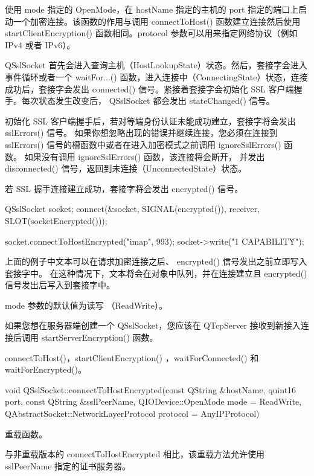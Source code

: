 使用 mode 指定的 OpenMode，在 hostName 指定的主机的 port 指定的端口上启动一个加密连接。该函数的作用与调用 connectToHost() 函数建立连接然后使用 startClientEncryption() 函数相同。protocol 参数可以用来指定网络协议（例如 IPv4 或者 IPv6）。

QSslSocket 首先会进入查询主机（HostLookupState）状态。然后，套接字会进入事件循环或者一个 waitFor...() 函数，进入连接中（ConnectingState）状态，连接成功后，套接字会发出 connected() 信号。紧接着套接字会初始化 SSL 客户端握手。每次状态发生改变后， QSslSocket 都会发出 stateChanged() 信号。

初始化 SSL 客户端握手后，若对等端身份认证未能成功建立，套接字将会发出 sslErrors() 信号。
如果你想忽略出现的错误并继续连接，您必须在连接到 sslErrors() 
信号的槽函数中或者在进入加密模式之前调用 ignoreSslErrors() 函数。
如果没有调用 ignoreSslErrors() 函数，该连接将会断开，
并发出 disconnected() 信号，返回到未连接（UnconnectedState）状态。

若 SSL 握手连接建立成功，套接字将会发出 encrypted() 信号。

\begin{cppcode}
QSslSocket socket;
connect(&socket, SIGNAL(encrypted()), receiver, SLOT(socketEncrypted()));

socket.connectToHostEncrypted("imap", 993);
socket->write("1 CAPABILITY\r\n");
\end{cppcode}

\begin{notice}
上面的例子中文本可以在请求加密连接之后、 encrypted() 信号发出之前立即写入套接字中。
在这种情况下，文本将会在对象中队列，并在连接建立且 encrypted() 信号发出后写入到套接字中。
\end{notice}

mode 参数的默认值为读写 （ReadWrite）。

如果您想在服务器端创建一个 QSslSocket，您应该在 QTcpServer 接收到新接入连接后调用 startServerEncryption() 函数。

\begin{seeAlso}
connectToHost()，startClientEncryption() ，waitForConnected() 和 waitForEncrypted()。
\end{seeAlso}


void QSslSocket::connectToHostEncrypted(const QString \&hostName, quint16 port, const QString \&sslPeerName, QIODevice::OpenMode mode = ReadWrite, QAbstractSocket::NetworkLayerProtocol protocol = AnyIPProtocol)

重载函数。

与非重载版本的 connectToHostEncrypted 相比，该重载方法允许使用 sslPeerName 指定的证书服务器。


